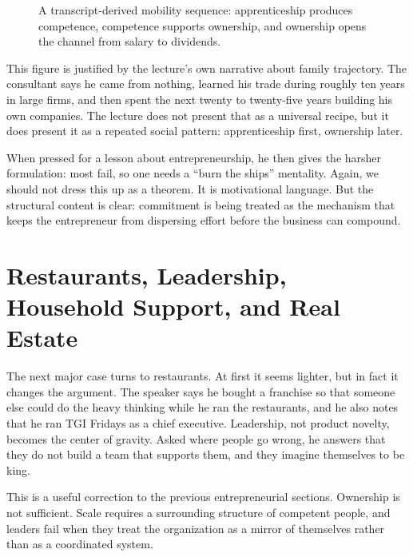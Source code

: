 \begin{figure}[h]
\centering
{}
\caption{A transcript-derived mobility sequence: apprenticeship produces competence, competence supports ownership, and ownership opens the channel from salary to dividends.}
\end{figure}

This figure is justified by the lecture's own narrative about family trajectory. The consultant says he came from nothing, learned his trade during roughly ten years in large firms, and then spent the next twenty to twenty-five years building his own companies. The lecture does not present that as a universal recipe, but it does present it as a repeated social pattern: apprenticeship first, ownership later.

When pressed for a lesson about entrepreneurship, he then gives the harsher formulation: most fail, so one needs a ``burn the ships'' mentality. Again, we should not dress this up as a theorem. It is motivational language. But the structural content is clear: commitment is being treated as the mechanism that keeps the entrepreneur from dispersing effort before the business can compound.

\section{Restaurants, Leadership, Household Support, and Real Estate}

The next major case turns to restaurants. At first it seems lighter, but in fact it changes the argument. The speaker says he bought a franchise so that someone else could do the heavy thinking while he ran the restaurants, and he also notes that he ran TGI Fridays as a chief executive. Leadership, not product novelty, becomes the center of gravity. Asked where people go wrong, he answers that they do not build a team that supports them, and they imagine themselves to be king.

This is a useful correction to the previous entrepreneurial sections. Ownership is not sufficient. Scale requires a surrounding structure of competent people, and leaders fail when they treat the organization as a mirror of themselves rather than as a coordinated system.

